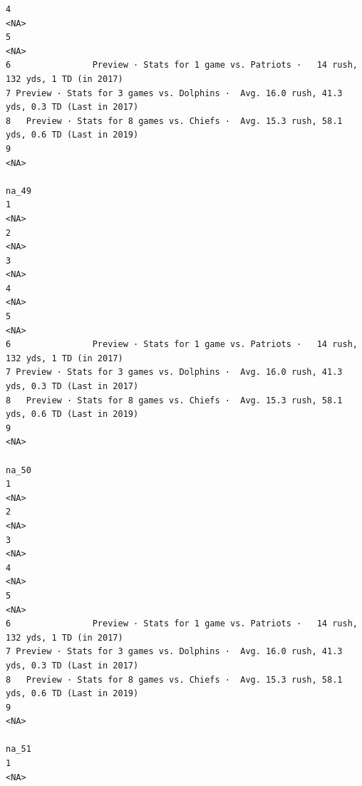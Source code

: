 \documentclass[
]{article}
\begin{document}
\begin{verbatim}
4                                                                                        <NA>
5                                                                                        <NA>
6                Preview · Stats for 1 game vs. Patriots ·   14 rush, 132 yds, 1 TD (in 2017)
7 Preview · Stats for 3 games vs. Dolphins ·  Avg. 16.0 rush, 41.3 yds, 0.3 TD (Last in 2017)
8   Preview · Stats for 8 games vs. Chiefs ·  Avg. 15.3 rush, 58.1 yds, 0.6 TD (Last in 2019)
9                                                                                        <NA>
                                                                                        na_49
1                                                                                        <NA>
2                                                                                        <NA>
3                                                                                        <NA>
4                                                                                        <NA>
5                                                                                        <NA>
6                Preview · Stats for 1 game vs. Patriots ·   14 rush, 132 yds, 1 TD (in 2017)
7 Preview · Stats for 3 games vs. Dolphins ·  Avg. 16.0 rush, 41.3 yds, 0.3 TD (Last in 2017)
8   Preview · Stats for 8 games vs. Chiefs ·  Avg. 15.3 rush, 58.1 yds, 0.6 TD (Last in 2019)
9                                                                                        <NA>
                                                                                        na_50
1                                                                                        <NA>
2                                                                                        <NA>
3                                                                                        <NA>
4                                                                                        <NA>
5                                                                                        <NA>
6                Preview · Stats for 1 game vs. Patriots ·   14 rush, 132 yds, 1 TD (in 2017)
7 Preview · Stats for 3 games vs. Dolphins ·  Avg. 16.0 rush, 41.3 yds, 0.3 TD (Last in 2017)
8   Preview · Stats for 8 games vs. Chiefs ·  Avg. 15.3 rush, 58.1 yds, 0.6 TD (Last in 2019)
9                                                                                        <NA>
                                                                                        na_51
1                                                                                        <NA>

\end{verbatim}
\end{document}
